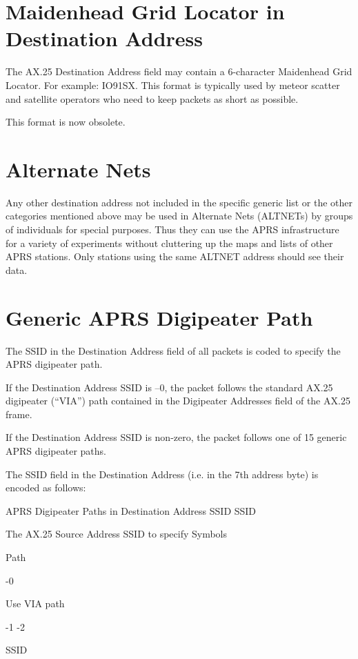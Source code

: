 \section {Maidenhead Grid Locator in Destination Address}

The AX.25 Destination Address field may contain a 6-character Maidenhead
Grid Locator. For example: IO91SX. This format is typically used by meteor
scatter and satellite operators who need to keep packets as short as possible.

This format is now obsolete.

\section{Alternate Nets}

Any other destination address not included in the specific generic list or the
other categories mentioned above may be used in Alternate Nets (ALTNETs)
by groups of individuals for special purposes. Thus they can use the APRS
infrastructure for a variety of experiments without cluttering up the maps and
lists of other APRS stations. Only stations using the same ALTNET address
should see their data.

\section{Generic APRS Digipeater Path}


The SSID in the Destination Address field of all packets is coded to specify
the APRS digipeater path.

If the Destination Address SSID is –0, the packet follows the standard AX.25
digipeater (“VIA”) path contained in the Digipeater Addresses field of the
AX.25 frame.

If the Destination Address SSID is non-zero, the packet follows one of 15
generic APRS digipeater paths.


The SSID field in the Destination Address (i.e. in the 7th address byte) is
encoded as follows:


APRS Digipeater Paths in Destination Address SSID
SSID

The AX.25 Source
Address SSID to
specify Symbols

Path

-0

Use VIA path

-1
-2

SSID

